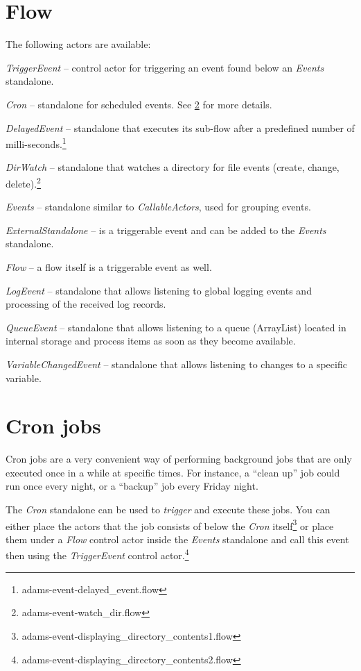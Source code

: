 \documentclass[a4paper]{book}
\begin{document}
\chapter{Flow}
The following actors are available:
\begin{tight_itemize}
	\item \textit{TriggerEvent} -- control actor for triggering an event found
	below an \textit{Events} standalone.
	\item \textit{Cron} -- standalone for scheduled events. See \ref{cron} for 
	more details.
	\item \textit{DelayedEvent} -- standalone that executes its sub-flow after
	a predefined number of milli-seconds.\footnote{adams-event-delayed\_event.flow}
	\item \textit{DirWatch} -- standalone that watches a directory for file
	events (create, change, delete).\footnote{adams-event-watch\_dir.flow}
	\item \textit{Events} -- standalone similar to \textit{CallableActors}, used
	for grouping events.
	\item \textit{ExternalStandalone} -- is a triggerable event and can be 
	added to the \textit{Events} standalone.
	\item \textit{Flow} -- a flow itself is a triggerable event as well.
	\item \textit{LogEvent} -- standalone that allows listening to global 
	logging events and processing of the received log records.
	\item \textit{QueueEvent} -- standalone that allows listening to a queue 
	(ArrayList) located in internal storage and process items as soon as they
	become available.
	\item \textit{VariableChangedEvent} -- standalone that allows listening to
	changes to a specific variable.
\end{tight_itemize}

\chapter{Cron jobs}
\label{cron}
Cron jobs are a very convenient way of performing background jobs that are only
executed once in a while at specific times. For instance, a ``clean up'' job 
could run once every night, or a ``backup'' job every Friday night.

The \textit{Cron} standalone can be used to \textit{trigger} and execute these 
jobs. You can either place the actors that the job consists of below the 
\textit{Cron} itself\footnote{adams-event-displaying\_directory\_contents1.flow} 
or place them under a \textit{Flow} control actor inside
the \textit{Events} standalone and call this event then using the 
\textit{TriggerEvent} control 
actor.\footnote{adams-event-displaying\_directory\_contents2.flow}
\end{document}
